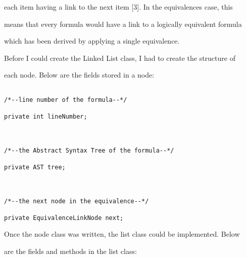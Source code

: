 \documentclass{report}
\begin{document}
each item having a link to the next item [3]. In the equivalences case, this

means that every formula would have a link to a logically equivalent formula

which has been derived by applying a single equivalence.



Before I could create the Linked List class, I had to create the structure of

each node. Below are the fields stored in a node:



\begin{lstlisting}[caption=Fields held in a list node, label=find]

/*--line number of the formula--*/

private int lineNumber;



/*--the Abstract Syntax Tree of the formula--*/

private AST tree;



/*--the next node in the equivalence--*/

private EquivalenceLinkNode next;

\end{lstlisting}



Once the node class was written, the list class could be implemented. Below

are the fields and methods in the list class:
\end{document}
